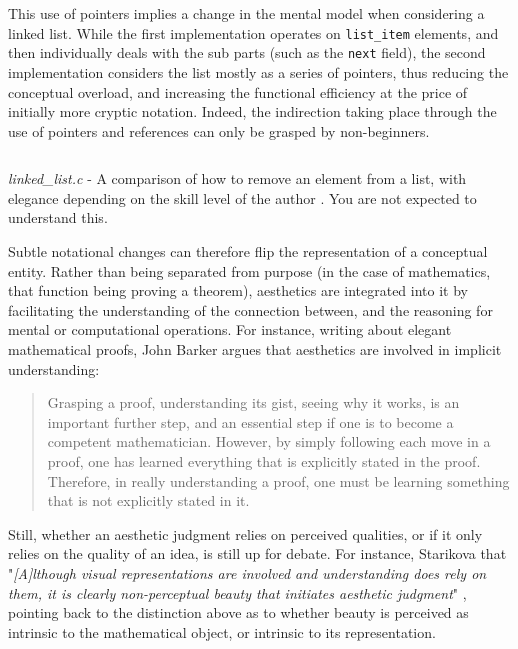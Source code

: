 This use of pointers implies a change in the mental model when considering a linked list. While the first implementation operates on \lstinline{list_item} elements, and then individually deals with the sub parts (such as the \lstinline{next} field), the second implementation considers the list mostly as a series of pointers, thus reducing the conceptual overload, and increasing the functional efficiency at the price of initially more cryptic notation. Indeed, the indirection taking place through the use of pointers and references can only be grasped by non-beginners.

\begin{listing}
    \inputminted{c}{./corpus/linked_list.c}
    \caption{\emph{linked\_list.c} - A comparison of how to remove an element from a list, with elegance depending on the skill level of the author \citep{kirchner_linked_2022a}. You are not expected to understand this.}
    \label{code:linked_list_remove}
\end{listing}

Subtle notational changes can therefore flip the representation of a conceptual entity. Rather than being separated from purpose (in the case of mathematics, that function being proving a theorem), aesthetics are integrated into it by facilitating the understanding of the connection between, and the reasoning for mental or computational operations. For instance, writing about elegant mathematical proofs, John Barker argues that aesthetics are involved in implicit understanding:

\begin{quote}
    Grasping a proof, understanding its gist, seeing why it works, is an important further step, and an essential step if one is to become a competent mathematician. However, by simply following each move in a proof, one has learned everything that is explicitly stated in the proof. Therefore, in really understanding a proof, one must be learning something that is not explicitly stated in it. \citep{barker_mathematical_beauty}
\end{quote}

Still, whether an aesthetic judgment relies on perceived qualities, or if it only relies on the quality of an idea, is still up for debate. For instance, Starikova that "\emph{[A]lthough visual representations are involved and understanding does rely on them, it is clearly non-perceptual beauty that initiates aesthetic judgment}" \citep{starikova_aesthetic_2018}, pointing back to the distinction above as to whether beauty is perceived as intrinsic to the mathematical object, or intrinsic to its representation.

